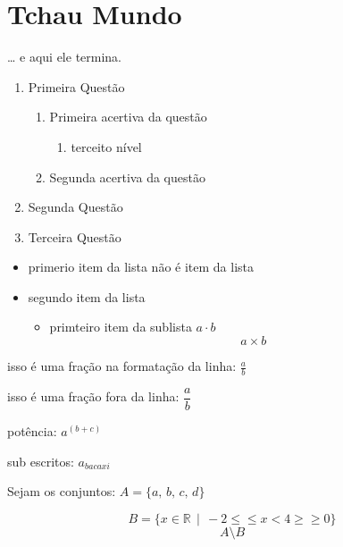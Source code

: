 \documentclass[a4paper,12pt]{article}
\begin{document}
   \section{Tchau Mundo}
   \ldots{} e aqui ele termina.
   \begin{enumerate}
       \item Primeira Questão
          \begin{enumerate}
             \item Primeira acertiva da questão
                \begin{enumerate}
                   \item terceito nível
                \end{enumerate}
             \item Segunda acertiva da questão
          \end{enumerate}

       \item Segunda Questão
       \item Terceira Questão 
   \end{enumerate}
   \begin{itemize}
      \item primerio item da lista
       não é item da lista
      \item segundo item da lista
          \begin{itemize}
            \item primteiro item da sublista
            $a \cdot b$ $$ a\times b $$
          \end{itemize}
   \end{itemize}
   isso é uma fração na formatação da linha: $\frac{a}{b}$ 
   
   isso é uma fração fora da linha: $\dfrac{a}{b}$
   
   potência: $a^{(b+c)}$
   
   sub escritos: $a_{bacaxi}$
   
   Sejam os conjuntos: $ A = \{ a,\,b,\,c,\,d\}$
   
   $$ B= \{ x\in \mathbb{R} \,\mid \,-2 \leq \leqslant x < 4\geqslant \geq 0 \}  $$ 
   $$A \setminus B$$
   
\end{document}
